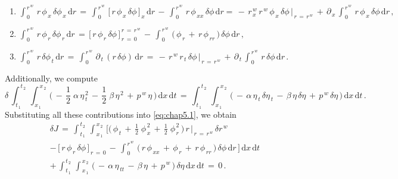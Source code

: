 \documentclass[alpha-refs, 12pt]{wiley-article}
\begin{document}
\begin{enumerate}
\item $\int_{\,0}^{\,r^{\,w}}\,r\,\phi_{\,x}\,\delta \phi_{\,x}\,\mathrm{d}r\,=\,\int_{\,0}^{\,r^{\,w}}\,\bigl[\,r\,\phi_{\,x}\,\delta \phi\,\bigr]_{\,x}\,\mathrm{d}r\,-\,\int_{\,0}^{\,r^{\,w}}\,r\,\phi_{\,xx}\,\delta \phi\,\mathrm{d}r =\,-\,r_{\,x}^{\,w}\,r^{\,w}\,\phi_{\,x}\,\delta \phi\,\biggr|_{\,r\,=\,r^{\,w}}\,+\,\partial_{\,x}\,\int_{\,0}^{\,r^{\,w}}\,r\,\phi_{\,x}\,\delta \phi\,\mathrm{d}r\,,$
\item $\int_{\,0}^{\,r^{\,w}}\,r\,\phi_{\,r}\,\delta \phi_{\,r}\,\mathrm{d}r\,=\,\bigl[\,r\,\phi_{\,r}\,\delta \phi\,\bigr]_{\,r\,=\,0}^{\,r\,=\,r^{\,w}}\,-\,\int_{\,0}^{\,r^{\,w}}\,\bigl(\,\phi_{\,r}\,+\,r\,\phi_{\,rr}\,\bigr)\,\delta \phi\,\mathrm{d}r\,,$
\item $\int_{\,0}^{\,r^{\,w}}\,r\,\delta \phi_{\,t}\,\mathrm{d}r\,=\,\int_{\,0}^{\,r^{\,w}}\,\partial_{\,t}\,(r\,\delta \phi)\,\mathrm{d}r\,=\,-\,r^{\,w}\,r_{\,t}\,\delta \phi\,\biggr|_{\,r\,=\,r^{\,w}}\,+\,\partial_{\,t}\,\int_{\,0}^{\,r^{\,w}}\,r\,\delta \phi\,\mathrm{d}r\,.$
\end{enumerate}
Additionally, we compute
\begin{equation*}
  \delta\,\int_{\,t_{\,1}}^{\,t_{\,2}}\,\int_{\,x_{\,1}}^{\,x_{\,2}}\,\biggl(\,-\,\frac{1}{2}\;\alpha\,\eta_{\,t}^{\,2}\,-\,\frac{1}{2}\;\beta\,\eta^{\,2}\,+\,p^{\,w}\,\eta\,\biggr)\,\mathrm{d}x\,\mathrm{d}t\,=\,\int_{\,t_{\,1}}^{\,t_{\,2}}\,\int_{\,x_{\,1}}^{\,x_{\,2}}\,\bigl(\,-\,\alpha\,\eta_{\,t}\,\delta \eta_{\,t}\,-\,\beta\,\eta\,\delta \eta\,+\,p^{\,w}\,\delta \eta\,\bigr)\,\mathrm{d}x\,\mathrm{d}t\,.
\end{equation*}
Substituting all these contributions into \eqref{eq:chap5.1}, we obtain
\begin{multline*}
  \delta J\,=\,\int_{\,t_{\,1}}^{\,t_{\,2}}\,\int_{\,x_{\,1}}^{\,x_{\,2}}\,\Biggl[\biggl(\,\phi_{\,t}\,+\,\frac{1}{2}\;\phi_{\,x}^{\,2}\,+\,\frac{1}{2}\;\phi_{\,r}^{\,2}\,\biggr)\,r\,\biggr\vert_{\,r\,=\,r^{\,w}}\,\delta r^{\,w} \\
  -\,\bigl[\,r\,\phi_{\,r}\,\delta \phi\,\bigr]_{\,r\,=\,0} \,-\,\int_{\,0}^{\,r^{\,w}}\,\bigl(\,r\,\phi_{\,xx}\,+\,\phi_{\,r}\,+\,r\,\phi_{\,rr}\,\bigr)\,\delta \phi\,\mathrm{d}r\,\Biggr]\,\mathrm{d}x\,\mathrm{d}t \\
  +\,\int_{\,t_{\,1}}^{\,t_{\,2}}\,\int_{\,x_{\,1}}^{\,x_{\,2}}\,\bigl(\,-\,\alpha\,\eta_{\,tt}\,-\,\beta\,\eta\,+\,p^{\,w}\,\bigr)\,\delta \eta\,\mathrm{d}x\,\mathrm{d}t\,=\,0\,.
\end{multline*}
\end{document}
